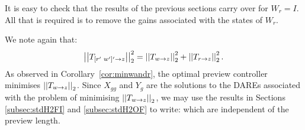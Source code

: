 It is easy to check that the results of the previous sections carry over for $W_r=I$. All that is required is to remove the  gains associated with the states of $W_r$.

We note again that:
% 
\begin{equation}
\left|\left| T_{{[r'\,\,w']'}\rightarrow z} \right|\right|^2_2 =
\left|\left| T_{w\rightarrow z} \right|\right|^2_2+
\left|\left| T_{r\rightarrow z} \right|\right|^2_2. \label{proj_prop}
\end{equation}
%
As observed in Corollary~\ref{cor:minwandr}, the optimal preview controller minimises $\left|\left| T_{w\rightarrow z} \right|\right|_2$. Since $X_{gg}$ and $Y_g$ are the solutions to the DAREs associated with the problem of minimising $\left|\left| T_{w\rightarrow z} \right|\right|_2$, we may use the results in Sections \ref{subsec:stdH2FI} and \ref{subsec:stdH2OF} to write:
which are independent of the preview length.

